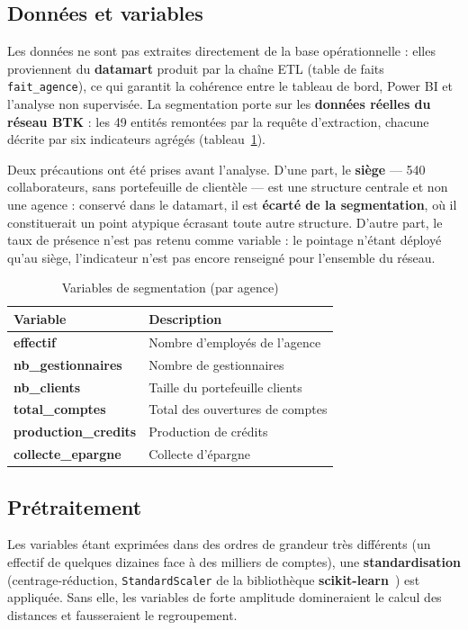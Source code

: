 \subsection{Données et variables}
Les données ne sont pas extraites directement de la base opérationnelle : elles
proviennent du \textbf{datamart} produit par la chaîne ETL (table de faits
\texttt{fait\_agence}), ce qui garantit la cohérence entre le tableau de bord,
Power BI et l'analyse non supervisée. La segmentation porte sur les
\textbf{données réelles du réseau BTK} : les 49 entités remontées par la requête
d'extraction, chacune décrite par six indicateurs agrégés
(tableau~\ref{tab:variables_clustering}).

Deux précautions ont été prises avant l'analyse. D'une part, le \textbf{siège}
--- 540 collaborateurs, sans portefeuille de clientèle --- est une structure
centrale et non une agence : conservé dans le datamart, il est \textbf{écarté de
la segmentation}, où il constituerait un point atypique écrasant toute autre
structure. D'autre part, le taux de présence n'est pas retenu comme variable : le
pointage n'étant déployé qu'au siège, l'indicateur n'est pas encore renseigné pour
l'ensemble du réseau.

\begin{table}[htbp]
\centering
\caption{Variables de segmentation (par agence)}
\label{tab:variables_clustering}
\renewcommand{\arraystretch}{1.2}
\begin{tabularx}{\textwidth}{|>{\bfseries}p{4cm}|X|}
\hline
\textmd{\textbf{Variable}} & \textbf{Description}\\
\hline
effectif & Nombre d'employés de l'agence\\
\hline
nb\_gestionnaires & Nombre de gestionnaires\\
\hline
nb\_clients & Taille du portefeuille clients\\
\hline
total\_comptes & Total des ouvertures de comptes\\
\hline
production\_credits & Production de crédits\\
\hline
collecte\_epargne & Collecte d'épargne\\
\hline
\end{tabularx}
\end{table}

\subsection{Prétraitement}
Les variables étant exprimées dans des ordres de grandeur très différents (un
effectif de quelques dizaines face à des milliers de comptes), une
\textbf{standardisation} (centrage-réduction, \texttt{StandardScaler} de la
bibliothèque \textbf{scikit-learn}~\cite{scikitlearn}) est
appliquée. Sans elle, les variables de forte amplitude domineraient le calcul des
distances et fausseraient le regroupement.

